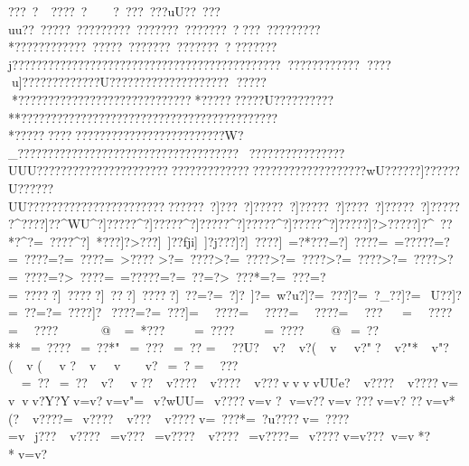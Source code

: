 {{{{{{{{{{{{{{{{{{{{{{{{{{{{{{{{{{{{{{{{{{{{{{{{{{{{{{{{{{{{{{{{{{{{{{{{{{{{{{{{{{{{{{{{{{{{{{{{{{{{{{{{{{{{{{{{{{{{{{{{{{{{{{{{{{{{{{{{{{{{{{{{{{{{{{{{{{{{{{{{{{{{{{{{{{{{{{{{{{{{{{{{{{{{{{{{{{{{{{{{{{{{{{{{{{{{{{{{{{{{{{{{{{{{{{{{{{{{{{{{{{{{{{{{{{{{{{{{{{{{{{{{{{{{{{{{{{{{{{{{{{{{{{{{{{{{{{{{{{{{{{{{{{{{{{{{{{{{{{{{{{{{{{{{{{{{{{{{{{{{{{{{{{{{{{{{{{{{{{{{{{{{{{{{{{{{{{{{{{{{{{{{{{{{{{{{{{{{{{{{{{{{{{{{{{{{{{{{{{{{{{{{{{{{{{{{{{{{{{{{{{{{{{{{{{{{{{{{{{{{{{{{{{{{{{{{{{{{{{{{{{{{{{{{{{{{{{{{{{{{{{{{{{{{{{{{{{{{{{{{{{{{{{{{{{{{{{{{{{{{{{{{{{{{{{{{{{{{{{{{{{{{{{{{{{{{{{{{{{{{{{{{{{{{{{{{{{{{{{{{{{{{{{{{{{{{{{{{{{{{{{{{{{{{{{{{{{{{{{{{{{{{{{{{{{{{{{{{{{{{{{{{{{{{{{{{{{{{{{{{{{{{{{{{{{{{{{{{{{{{{{{{{{{{{{{{{{{{{{{{{{{{{{{{{{{{{{{{{{{{{{{{{{{{{{{{{{{{{{{{{{{{{{{{{{{{{{{{{{{{{{{{{{{{{{{{{{{{{{{{{{{{{{{{{{{{{{{{{{{{{{{{{{{{{{{{{{{{{{{{{{{{{{{{{{{{{{{{{{{{{{{{{{{{{{{{{{{{{{{{{{{{{{{{{{{{{{{{{{{{{{{{{{{{{{{{{{{{{{{{{{{{{{{{{{{{{{{{{{{{{{{{{{{{{{{{{{{{{{{{{{{{{{{{{{{{{{{{{{{{{{{{{{{{{{{{{{{{{{{{{{{{{{{{{{{{{{{{{{{{{{{{{{{{{{{{{{{{{{{{{{{{{{{{{{{{{{{{{{{{{{{{{{{{{{{{{{{{{{{{{{{{{{{{{{{{{{{{{{{{{{{{{{{{{{{{{{{{{{{{{{{{{{{{{{{{{{{{{{{{{{{{{{{{{{{{{{{{{{{{{{{{{{{{{{{{{{{{{{{{{{{{{{{{{{{{{{{{{{{{{{{{{???~?~~????~?~~  ~?~?    ??~???uU??~???uu??~?????~?????????~???????~???????~? ? ??~?????????*????????????~?????~???????~???????~?
???????j???????????????????????????????????????????????????  ??????  
????}u]?????????????U???????????????????? 
?????
*?????????????????? ???????????*?????   ?????U??????????**???????????????????????????????????????????
*?????   ????   ????    ?????????????????????W?_?????????????????????????????????????????????????    ????UUU??????????????????????????????????????????????????????wU??????]??????}U??????UU?????????????????????????????~?]???~?]?????~?]?????~?]????~?]?????~?]?????}?^???}?]??^WU^?]?????^?]?????^?]?????^?]?????^?]?????^?]?????]?>?????]?^~??*?^?=~????^?]~*???]?>???]~]??fji]~]?j???]?]~????]~=?*???=?]~????=~=?????=?=~????=?=~????=~>????
>?=~????>?=~????>?=~????>?=~????>?=~????>?=~????=?>~????=~=?????=?=~??=?>~???*=?=~???=?=~?????]~?????]~???]~?????]~??=?=~?]?~]?=~w?u?]?=~}???]?=~?_??]?=~U??]?=~??}}=?=~????]?~????=?=~???]=~~????=~~????=~~????=~~???~~    =~~????=~~????~~    ~~@ ~=~*???~~    ~=~????~~    ~=~????~~ @~=~??**~=~????~=~??*"~=~??? ~=~??
 =~~??U?~v   ?~v ? (~v    ~v?"?~v ?"*~v "?(~v  (~v   ?~v 
  ~v  ~v   ?~=~?
  =~~???~=~??  ~=~??  ~v?  ~v ??~v????~v????~v???vv    vvUUe?~v????~v????v=v   vv?Y?Yv=v?   v=v"   =~v?wUU=~v????v=v
?
 v=v ?? v=v
???v=v? ??v=v *(?~v????=~v????~v???~v????v=~???*=~?u????v=~????=v~j???~v????~=v???~=v????~v????~=v????=~v????v=v???v=v*?*v=v?
 }}}}}}}}}}}}}}}}}}}}}}}}}}}}}}}}}}}}}}}}}}}}}}}}}}}}}}}}}}}}}}}}}}}}}}}}}}}}}}}}}}}}}}}}}}}}}}}}}}}}}}}}}}}}}}}}}}}}}}}}}}}}}}}}}}}}}}}}}}}}}}}}}}}}}}}}}}}}}}}}}}}}}}}}}}}}}}}}}}}}}}}}}}}}}}}}}}}}}}}}}}}}}}}}}}}}}}}}}}}}}}}}}}}}}}}}}}}}}}}}}}}}}}}}}}}}}}}}}}}}}}}}}}}}}}}}}}}}}}}}}}}}}}}}}}}}}}}}}}}}}}}}}}}}}}}}}}}}}}}}}}}}}}}}}}}}}}}}}}}}}}}}}}}}}}}}}}}}}}}}}}}}}}}}}}}}}}}}}}}}}}}}}}}}}}}}}}}}}}}}}}}}}}}}}}}}}}}}}}}}}}}}}}}}}}}}}}}}}}}}}}}}}}}}}}}}}}}}}}}}}}}}}}}}}}}}}}}}}}}}}}}}}}}}}}}}}}}}}}}}}}}}}}}}}}}}}}}}}}}}}}}}}}}}}}}}}}}}}}}}}}}}}}}}}}}}}}}}}}}}}}}}}}}}}}}}}}}}}}}}}}}}}}}}}}}}}}}}}}}}}}}}}}}}}}}}}}}}}}}}}}}}}}}}}}}}}}}}}}}}}}}}}}}}}}}}}}}}}}}}}}}}}}}}}}}}}}}}}}}}}}}}}}}}}}}}}}}}}}}}}}}}}}}}}}}}}}}}}}}}}}}}}}}}}}}}}}}}}}}}}}}}}}}}}}}}}}}}}}}}}}}}}}}}}}}}}}}}}}}}}}}}}}}}}}}}}}}}}}}}}}}}}}}}}}}}}}}}}}}}}}}}}}}}}}}}}}}}}}}}}}}}}}}}}}}}}}}}}}}}}}}}}}}}}}}}}}}}}}}}}}}}}}}}}}}}}}}}}}}}}}}}}}}}}}}}}}}}}}}}}}}}}}}}}}}}}}}}}}}}}}}}}}}}}}}}}}}}}}}}}}}}}}}}}}}}}}}}}}}}}}}}}}}}}}}}}}}}}}}}}}}}}}}}}}}}}}}}}}}}}}}}}}}}}}}}}}}}}}}}}}}}}}}}}}}}}}}}}}}}}}}}}}}}}}}}}}}}}}}}}}}}}}}}}}}}}}}}}}}}}}}}}}}}}}}}}}}}}}}}}}}}}}}}}}}}}}}}}}}}}}}}}}}}}}}}}}}}}}}}}}}}}}}}}}}}}}}}}}}}}}}}}}}}}}}}}}}}}}
